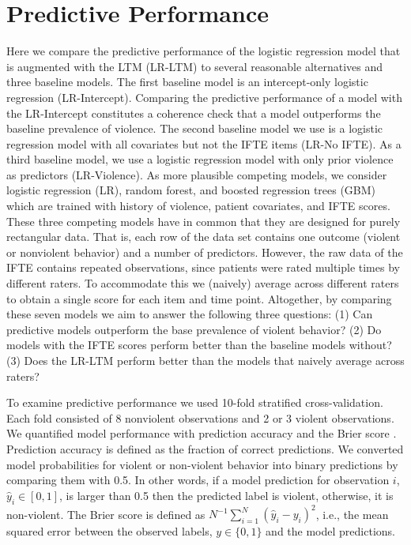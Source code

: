 \documentclass[a4paper,11pt]{article}
\begin{document}
\section{Predictive Performance}

Here we compare the predictive performance of the logistic regression model that is augmented with the LTM (LR-LTM) to several reasonable alternatives and three baseline models.
The first baseline model is an intercept-only logistic regression (LR-Intercept). 
Comparing the predictive performance of a model with the LR-Intercept constitutes a coherence check that a model outperforms the baseline prevalence of violence.
The second baseline model we use is a logistic regression model with all covariates but not the IFTE items (LR-No IFTE).
As a third baseline model, we use a logistic regression model with only prior violence as predictors (LR-Violence).
As more plausible competing models, we consider logistic regression (LR), random forest, and boosted regression trees (GBM) which are trained with history of violence, patient covariates, and IFTE scores.
These three competing models have in common that they are designed for purely rectangular data.
That is, each row of the data set contains one outcome (violent or nonviolent behavior) and a number of predictors.
However, the raw data of the IFTE contains repeated observations, since patients were rated multiple times by different raters.
To accommodate this we (naively) average across different raters to obtain a single score for each item and time point.
Altogether, by comparing these seven models we aim to answer the following three questions: (1) Can predictive models outperform the base prevalence of violent behavior? (2) Do models with the IFTE scores perform better than the baseline models without? (3) Does the LR-LTM perform better than the models that naively average across raters?

To examine predictive performance we used 10-fold stratified cross-validation.
Each fold consisted of 8 nonviolent observations and 2 or 3 violent observations.
We quantified model performance with prediction accuracy and the Brier score \parencite{brier1950verification}.
Prediction accuracy is defined as the fraction of correct predictions.
We converted model probabilities for violent or non-violent behavior into binary predictions by comparing them with 0.5.
In other words, if a model prediction for observation $i$, $\hat{y}_i\in [0, 1]$, is larger than 0.5 then the predicted label is violent, otherwise, it is non-violent.
The Brier score is defined as $N^{-1}\sum_{i=1}^N\left(\hat{y}_i-y_{i}\right)^2$, i.e., the mean squared error between the observed labels, $y\in\{0,1\}$ and the model predictions.
\end{document}
